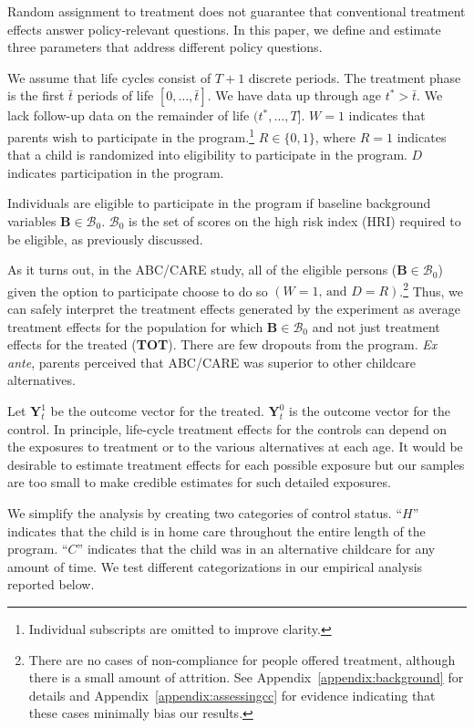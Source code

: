 Random assignment to treatment does not guarantee that conventional treatment effects answer policy-relevant questions. In this paper, we define and estimate three parameters that address different policy questions.

We assume that life cycles consist of $T+1$ discrete periods. The treatment phase is the first $\bar{t}$ periods of life $\left[0,\dots,\bar{t}\right]$. We have data up through age $t^{*}>\bar{t}$. We lack follow-up data on the remainder of life $(t^*,\dots,T]$. $W=1$ indicates that parents wish to participate in the program.\footnote{Individual subscripts are omitted to improve clarity.} $R \in \{0,1\}$, where $R=1$ indicates that a child is randomized into eligibility to participate in the program. $D$ indicates participation in the program.

Individuals are eligible to participate in the program if baseline background variables $\bm{B}\in\mathcal{B}_0$. $\mathcal{B}_0$ is the set of scores on the high risk index (HRI) required to be eligible, as previously discussed.

As it turns out, in the ABC/CARE study, all of the eligible persons ($\bm{B}\in\mathcal{B}_0$) given the option to participate choose to do so $(W=1\text{, and } D=R)$.\footnote{There are no cases of non-compliance for people offered treatment, although there is a small amount of attrition. See Appendix~\ref{appendix:background} for details and Appendix~\ref{appendix:assessingcc} for evidence indicating that these cases minimally bias our results.} Thus, we can safely interpret the treatment effects generated by the experiment as average treatment effects for the population for which $\bm{B}\in\mathcal{B}_0$ and not just treatment effects for the treated (\textbf{TOT}). There are few dropouts from the program. \emph{Ex ante}, parents perceived that ABC/CARE was superior to other childcare alternatives.

Let $\bm{Y}^1_t$ be the outcome vector for the treated. $\bm{Y}^0_t$ is the outcome vector for the control. In principle, life-cycle treatment effects for the controls can depend on the exposures to treatment or to the various alternatives at each age. It would be desirable to estimate treatment effects for each possible exposure but our samples are too small to make credible estimates for such detailed exposures.

We simplify the analysis by creating two categories of control status. ``$H$'' indicates that the child is in home care throughout the entire length of the program. ``$C$'' indicates that the child was in an alternative childcare for any amount of time. We test different categorizations in our empirical analysis reported below.

